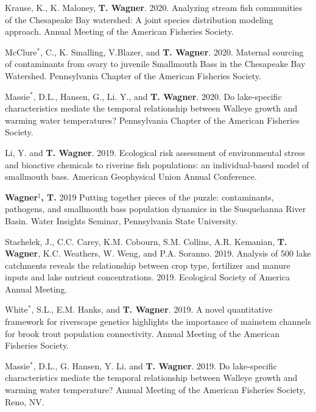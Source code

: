 \documentclass[10pt]{article}
\begin{document}
\begin{flushleft}
\begin{etaremune}
\item Krause, K., K. Maloney, \textbf{T. Wagner}. 2020. Analyzing stream fish communities of the Chesapeake Bay watershed: A joint species distribution modeling approach. Annual Meeting of the American Fisheries Society. 

\item McClure$^*$, C., K. Smalling, V.Blazer, and \textbf{T. Wagner}. 2020. Maternal sourcing of contaminants from ovary to juvenile Smallmouth Bass in the Chesapeake Bay Watershed. Pennsylvania Chapter of the American Fisheries Society.

\item Massie$^*$, D.L., Hansen, G., Li. Y., and \textbf{T. Wagner}. 2020. Do lake-specific characteristics mediate the temporal relationship between Walleye growth and warming water temperatures? Pennsylvania Chapter of the American Fisheries Society.

\item Li, Y. and \textbf{T. Wagner}. 2019. Ecological risk assessment of environmental stress and bioactive chemicals to riverine fish populations: an individual-based model of smallmouth bass. American Geophysical Union Annual Conference.

\item \textbf{Wagner$^\ddagger$, T.} 2019 Putting together pieces of the puzzle: contaminants, pathogens, and smallmouth bass population dynamics in the Susquehanna River Basin. Water Insights Seminar, Pennsylvania State University. 

\item Stachelek, J., C.C. Carey, K.M. Cobourn, S.M. Collins, A.R. Kemanian, \textbf{T. Wagner}, K.C. Weathers, W. Weng, and P.A. Soranno. 2019. Analysis of 500 lake catchments reveals the relationship between crop type, fertilizer and manure inputs and lake nutrient concentrations. 2019. Ecological Society of America Annual Meeting.

\item White$^*$, S.L., E.M. Hanks, and \textbf{T. Wagner}. 2019. A novel quantitative framework for riverscape genetics highlights the importance of mainstem channels for brook trout population connectivity. Annual Meeting of the American Fisheries Society.

\item Massie$^*$, D.L., G. Hansen, Y. Li. and \textbf{T. Wagner}. 2019. Do lake-specific characteristics mediate the temporal relationship between Walleye growth and warming water temperature? Annual Meeting of the American Fisheries Society, Reno, NV.


\end{etaremune}
\end{flushleft}
\end{document}
